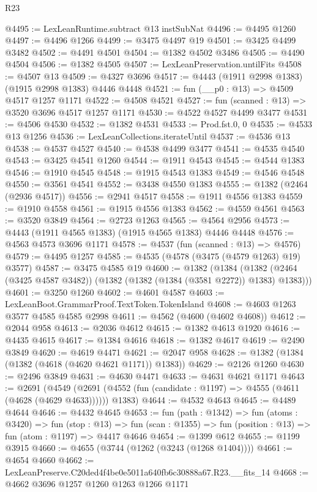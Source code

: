 \begin{lexlean}{R23}
\begin{coremodule}
@4495 := LexLeanRuntime.subtract @13 instSubNat
@4496 := @4495 @1260
@4497 := @4496 @1266
@4499 := @3475 @4497 @19
@4501 := @3425 @4499 @3482
@4502 := @4491 @4501
@4504 := @1382 @4502 @3486
@4505 := @4490 @4504
@4506 := @1382 @4505
@4507 := LexLeanPreservation.untilFits
@4508 := @4507 @13
@4509 := @4327 @3696
@4517 := @4443 (@1911 @2998 @1383) (@1915 @2998 @1383) @4446 @4448
@4521 := fun (__p0 : @13) => @4509 @4517 @1257 @1171
@4522 := @4508 @4521
@4527 := fun (scanned : @13) => @3520 @3696 @4517 @1257 @1171
@4530 := @4522 @4527 @4499 @3477
@4531 := @4506 @4530
@4532 := @1382 @4531
@4533 := Prod.fst.{0, 0}
@4535 := @4533 @13 @1256
@4536 := LexLeanCollections.iterateUntil
@4537 := @4536 @13
@4538 := @4537 @4527
@4540 := @4538 @4499 @3477
@4541 := @4535 @4540
@4543 := @3425 @4541 @1260
@4544 := @1911 @4543
@4545 := @4544 @1383
@4546 := @1910 @4545
@4548 := @1915 @4543 @1383
@4549 := @4546 @4548
@4550 := @3561 @4541
@4552 := @3438 @4550 @1383
@4555 := @1382 (@2464 (@2936 @4517))
@4556 := @2941 @4517
@4558 := @1911 @4556 @1383
@4559 := @1910 @4558
@4561 := @1915 @4556 @1383
@4562 := @4559 @4561
@4563 := @3520 @3849
@4564 := @2723 @1263
@4565 := @4564 @2956
@4573 := @4443 (@1911 @4565 @1383) (@1915 @4565 @1383) @4446 @4448
@4576 := @4563 @4573 @3696 @1171
@4578 := @4537 (fun (scanned : @13) => @4576)
@4579 := @4495 @1257
@4585 := @4535 (@4578 (@3475 (@4579 @1263) @19) @3577)
@4587 := @3475 @4585 @19
@4600 := @1382
    (@1384 (@1382 (@2464 (@3425 @4587 @3482)) (@1382 (@1382 (@1384 (@3581 @2272)) @1383) @1383)))
@4601 := @3250 @1260
@4602 := @4601 @4587
@4603 := LexLeanBoot.GrammarProof.TextToken.TokenIsland
@4608 := @4603 @1263 @3577 @4585 @4585 @2998
@4611 := @4562 (@4600 (@4602 @4608))
@4612 := @2044 @958
@4613 := @2036 @4612
@4615 := @1382 @4613 @1920
@4616 := @4435 @4615
@4617 := @1384 @4616
@4618 := @1382 @4617
@4619 := @2490 @3849
@4620 := @4619 @4471
@4621 := @2047 @958
@4628 := @1382 (@1384 (@1382 (@4618 (@4620 @4621 @1171)) @1383))
@4629 := @2126 @1260
@4630 := @2496 @3849
@4631 := @4630 @4471
@4633 := @4631 @4621 @1171
@4643 := @2691
    (@4549 (@2691 (@4552 (fun (candidate : @1197) => @4555 (@4611 (@4628 (@4629 @4633)))))) @1383)
@4644 := @4532 @4643
@4645 := @4489 @4644
@4646 := @4432 @4645
@4653 := fun (path : @1342) =>
  fun (atoms : @3420) =>
  fun (stop : @13) =>
  fun (scan : @1355) => fun (position : @13) => fun (atom : @1197) => @4417 @4646
@4654 := @1399 @612
@4655 := @1199 @3915
@4660 := @4655 (@3744 (@1262 (@3243 (@1268 @1404))))
@4661 := @4654 @4660
@4662 := LexLeanPreserve.C20ded4f4be0e5011a640fb6c30888a67.R23.__fits_14
@4668 := @4662 @3696 @1257 @1260 @1263 @1266 @1171

\end{coremodule}
\end{lexlean}
